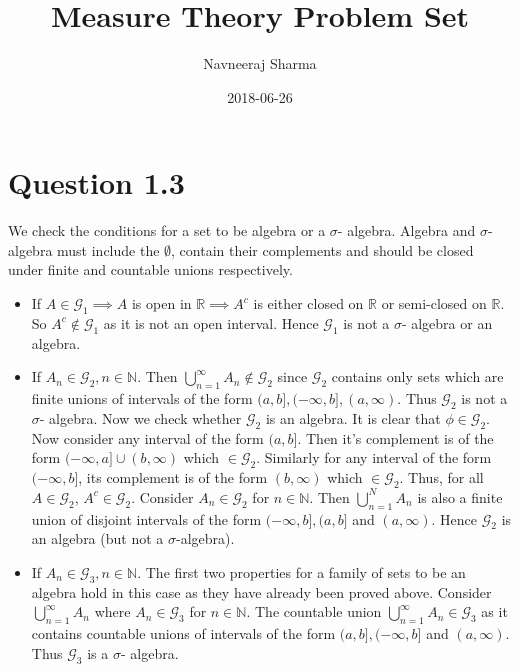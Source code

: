 \documentclass{article}
\title{ Measure Theory Problem Set}
\author{Navneeraj Sharma}
\date{2018-06-26}
\begin{document}
  \maketitle

  \section*{Question 1.3}
  
  We check the conditions for a set to be algebra or a $\sigma$- algebra. Algebra and $\sigma$- algebra must include the $ \emptyset$, contain their complements and should be closed under finite and countable unions respectively.
  
    \begin{itemize}

      \item If $A \in \mathcal{G}_1 \implies A $ is open in $\mathbb{R}\implies {A}^c$
      is either closed on $\mathbb{R}$ or semi-closed on $\mathbb{R}$. So ${A}^c \notin \mathcal{G}_1$
      as it is not an open interval. Hence $\mathcal{G}_1$ is not a $\sigma$- algebra or an algebra.

      \item If $A_n \in \mathcal{G}_2, n \in \mathbb{N}$. Then $\bigcup_{n=1}^{\infty}A_n \notin \mathcal{G}_2$
      since $\mathcal{G}_2$ contains only sets which are finite unions of intervals of the form $(a, b], (-\infty, b], (a, \infty)$.
      Thus $\mathcal{G}_2$ is not a $\sigma$- algebra. Now we check whether $\mathcal{G}_2$  is an algebra.
      It is clear that $\phi \in \mathcal{G}_2$. Now consider any interval of the form $(a,b]$.
      Then it's complement is of the form $(-\infty,a] \cup (b, \infty)$ which $\in \mathcal{G}_2$. Similarly for any interval of the form
      $(-\infty, b]$, its complement is of the form $(b, \infty)$ which $\in \mathcal{G}_2$. Thus, for all $A \in \mathcal{G}_2$, ${A}^c \in \mathcal{G}_2$.
      Consider ${A}_n \in \mathcal{G}_2$ for $n \in \mathbb{N}$. Then $\bigcup_{n=1}^{N}A_{n}$ is also a finite union
      of disjoint intervals of the form $(-\infty, b], (a,b]$ and  $(a, \infty)$. Hence $\mathcal{G}_2$ is an algebra (but not a $\sigma$-algebra).

      \item If $A_n \in \mathcal{G}_3, n \in \mathbb{N}$. The first two properties for a family of sets to be an algebra hold in this case
      as they have already been proved above. Consider $\bigcup_{n=1}^{\infty}A_{n}$ where ${A}_n \in \mathcal{G}_3$ for $n \in \mathbb{N}$.
      The countable union $\bigcup_{n=1}^{\infty}A_{n} \in \mathcal{G}_3$ as it contains countable unions of intervals of the form
      $(a,b], (-\infty, b]$ and $(a, \infty)$. Thus $\mathcal{G}_3$ is a $\sigma$- algebra.

    \end{itemize}
\end{document}
